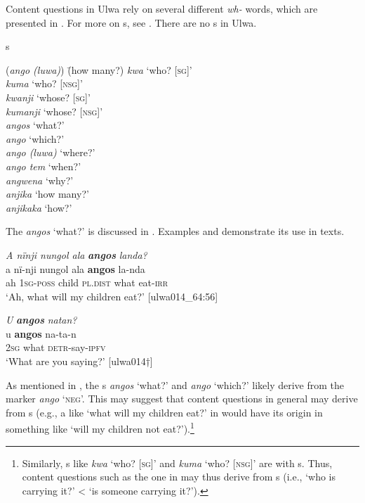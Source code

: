 Content questions in Ulwa rely on several different \textit{wh-} words, which are presented in . For more on s, see . There are no s in Ulwa.

\ea%
    \label{ex:syntax:9}
            s
\begin{tabbing}
{(\textit{ango (luwa)})} \= {(how many?)}\kill
    \textit{kwa}  \>    ‘who? [\textsc{sg]’}\\
    \textit{kuma} \>     ‘who? [\textsc{nsg]’}\\
    \textit{kwanji} \>     ‘whose? [\textsc{sg]’}\\
    \textit{kumanji} \>   ‘whose? \textsc{[nsg]’}\\
    \textit{angos}  \>    ‘what?’\\
\textit{ango}    \>  ‘which?’\\
\textit{ango (luwa)} \> ‘where?’\\
\textit{ango tem}   \> ‘when?’\\
\textit{angwena}  \>  ‘why?’\\
\textit{anjika}   \>   ‘how many?’\\
\textit{anjikaka}  \>  ‘how?’
\end{tabbing}
\z

  The  \textit{angos} ‘what?’ is discussed in . Examples  and  demonstrate its use in texts.

\ea%
    \label{ex:syntax:10}
          \textit{A nïnji nungol ala} \textbf{\textit{angos}} \textit{landa?}\\
\gll    a  nï-nji  nungol  ala      \textbf{angos}  la-nda\\
    ah  1\textsc{sg-poss}  child  \textsc{pl.dist}  what  eat-\textsc{irr}\\
\glt `Ah, what will my children eat?’ [ulwa014\_64:56]
\z

\ea%
    \label{ex:syntax:11}
          \textit{U} \textbf{\textit{angos}} \textit{natan?}\\
\gll    u    \textbf{angos}  na-ta-n\\
    2\textsc{sg}  what  \textsc{detr}{}-say-\textsc{ipfv}\\
\glt `What are you saying?’ [ulwa014†]
\z

As mentioned in , the s \textit{angos} ‘what?’ and \textit{ango} ‘which?’ likely derive from the  marker \textit{ango} ‘\textsc{neg}’. This may suggest that content questions in general may derive from s (e.g., a  like ‘what will my children eat?’ in  would have its origin in something like ‘will my children not eat?’).\footnote{Similarly, s like \textit{kwa} ‘who? [\textsc{sg]}’ and \textit{kuma}  ‘who? [\textsc{nsg]}’ are  with s. Thus, content questions such as the one in  may thus derive from s (i.e., ‘who is carrying it?’ < ‘is someone carrying it?’).}

